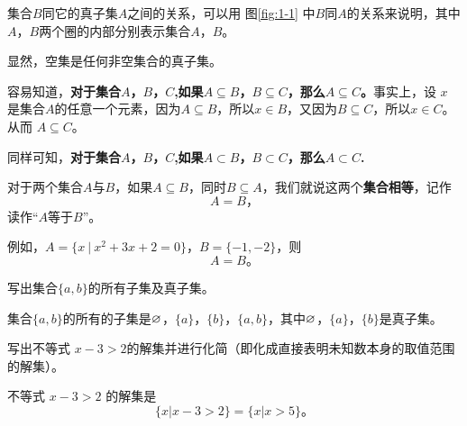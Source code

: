 集合$B$同它的真子集$A$之间的关系，可以用 图\ref{fig:1-1} 中$B$同$A$的关系来说明，其中$A$，$B$两个圈的内部分别表示集合$A$，$B$。

显然，空集是任何非空集合的真子集。

容易知道，\textbf{对于集合$A$，$B$，$C$,如果$A \subseteq B$，$B \subseteq C$，那么$A \subseteq C$。}事实上，设 $x$ 是集合$A$的任意一个元素，因为$A \subseteq B$，所以$x \in B$，又因为$B \subseteq C$，所以$x \in C$。从而 $A \subseteq C$。

同样可知，\textbf{对于集合$A$，$B$，$C$,如果$A \subset B$，$B \subset C$，那么$A \subset C$.}

对于两个集合$A$与$B$，如果$A \subseteq B$，同时$B \subseteq A$，我们就说这两个\textbf{集合相等}，记作
$$A = B \text{，}$$
读作“$A$等于$B$”。

例如，$A = \{x\ |\ x^2+3x+2=0\}$，$B = \{-1, -2\}$，则 $$A = B \text{。}$$

\liti 写出集合$\{a, b\}$的所有子集及真子集。

\jie 集合$\{a, b\}$的所有的子集是$\varnothing$，$\{a\}$，$\{b\}$，$\{a,b\}$，其中$\varnothing$，$\{a\}$，$\{b\}$是真子集。

\liti 写出不等式 $x-3>2$的解集并进行化简（即化成直接表明未知数本身的取值范围的解集）。

\jie 不等式 $x-3>2$ 的解集是 $$\{x | x-3>2\} = \{x | x>5\} \text{。}$$
